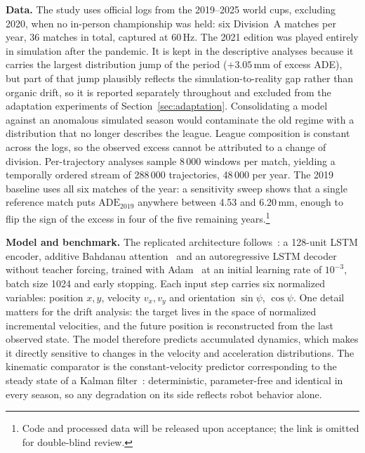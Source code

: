 \documentclass[conference]{IEEEtran}
\newif\ifmarkchanges
\newcommand{\chg}[1]{\ifmarkchanges\hl{#1}\else#1\fi}
\newcommand{\ins}[1]{\ifmarkchanges\hl{\footnotesize[+ #1]}\fi}
\begin{document}
\textbf{Data.}
The study uses official logs from the 2019--2025 \chg{world cups}, excluding
\chg{2020, when no in-person championship was held: six Division~A matches per
year, 36 matches in total,} captured at 60\,Hz. The 2021 edition was played
entirely in simulation \chg{after the pandemic}. It is kept in the descriptive
analyses because it carries the largest distribution jump of the period
($+3.05$\,mm of excess ADE), but part of that jump plausibly reflects the
\chg{simulation-to-reality gap} rather than organic drift, so it is reported
separately throughout and excluded from the adaptation experiments of
Section~\ref{sec:adaptation}.
Consolidating a model against an anomalous simulated season would contaminate
the old regime with a distribution that no longer describes the league.
\chg{League composition is constant across the logs, so the observed excess
cannot be attributed to a change of division.} Per-trajectory analyses sample
8\,000 windows per match, yielding a temporally ordered stream of 288\,000
trajectories, 48\,000 per year. The 2019 baseline uses all six matches of the
year: a sensitivity sweep shows that a single reference match puts
$\mathrm{ADE}_{2019}$ anywhere between 4.53 and 6.20\,mm, enough to flip the
sign of the excess in four of the five remaining years.\footnote{Code and
processed data will be released upon acceptance; the link is omitted for
double-blind review.}

\textbf{Model and benchmark.}
\chg{The replicated architecture follows\mbox{~\cite{seq2seq}}}: a 128-unit LSTM
encoder, \chg{additive Bahdanau attention\mbox{~\cite{bahdanau}}} and an
autoregressive LSTM decoder
without teacher forcing, trained with Adam~\cite{adam} at an initial learning
rate of $10^{-3}$, batch size 1024 and early stopping. Each input step carries
six normalized variables: \chg{position \mbox{$x,y$}, velocity
\mbox{$v_x,v_y$} and orientation \mbox{$\sin\psi$}, \mbox{$\cos\psi$}.}
\ins{como e feita a normalizacao} One detail matters for the drift analysis:
the target
lives in the space of normalized incremental velocities, and the future
position is reconstructed from the last observed state. The model therefore
predicts accumulated dynamics, which makes it directly sensitive to changes in
the velocity and acceleration distributions. \chg{The kinematic comparator is
the constant-velocity predictor corresponding to the steady state of a Kalman
filter\mbox{~\cite{kalman}}: deterministic, parameter-free and identical in
every season, so any degradation on its side reflects robot behavior alone.}
\end{document}
